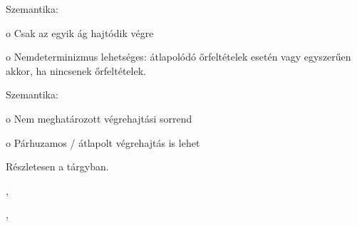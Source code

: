 \begin{definicio}
\end{definicio}



\begin{definicio}
\end{definicio}

\begin{definicio}
\end{definicio}


Szemantika:

o Csak az egyik ág hajtódik végre

o Nemdeterminizmus lehetséges: átlapolódó őrfeltételek esetén vagy egyszerűen akkor, ha nincsenek őrfeltételek.


Szemantika:

o Nem meghatározott végrehajtási sorrend

o Párhuzamos / átlapolt végrehajtás is lehet

Részletesen a \szgarch tárgyban.

\begin{definicio}
\end{definicio}


\begin{definicio}
	, 
\end{definicio}


\begin{definicio}
	, 
\end{definicio}



\begin{definicio}
\end{definicio}

